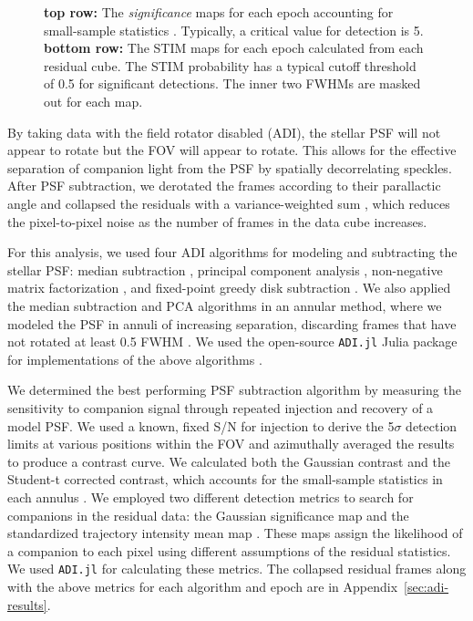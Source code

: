 \documentclass[twocolumn,linenumbers]{aastex631}
\begin{document}
\begin{figure*}
    \centering
    \caption{\textbf{top row:} The \textit{significance} maps for each epoch accounting for small-sample statistics \citep{mawetFundamentalLimitationsHigh2014}. Typically, a critical value for detection is 5. \textbf{bottom row:} The STIM maps for each epoch calculated from each residual cube. The STIM probability has a typical cutoff threshold of 0.5 for significant detections. The inner two FWHMs are masked out for each map.}
    \label{fig:detection}
\end{figure*}

By taking data with the field rotator disabled (ADI), the stellar PSF will not appear to rotate but the FOV will appear to rotate. This allows for the effective separation of companion light from the PSF by spatially decorrelating speckles.  After PSF subtraction, we derotated the frames according to their parallactic angle and collapsed the residuals with a variance-weighted sum \citep{bottomNoiseweightedAngularDifferential2017a}, which reduces the pixel-to-pixel noise as the number of frames in the data cube increases.

For this analysis, we used four ADI algorithms for modeling and subtracting the stellar PSF: median subtraction \citep{maroisAngularDifferentialImaging2006}, principal component analysis \citep[PCA, also referred to as KLIP;][]{soummerDetectionCharacterizationExoplanets2012a}, non-negative matrix factorization \citep[NMF;][]{renNonnegativeMatrixFactorization2018a}, and fixed-point greedy disk subtraction \citep[GreeDS;][]{pairetReferencelessAlgorithmCircumstellar2019a,pairetMAYONNAISEMorphologicalComponents2020}. We also applied the median subtraction and PCA algorithms in an annular method, where we modeled the PSF in annuli of increasing separation, discarding frames that have not rotated at least 0.5 FWHM \citep{maroisAngularDifferentialImaging2006}. We used the open-source \texttt{ADI.jl} Julia package for implementations of the above algorithms \citep{lucasADIJlJulia2020}.

We determined the best performing PSF subtraction algorithm by measuring the sensitivity to companion signal through repeated injection and recovery of a model PSF. We used a known, fixed S/N for injection to derive the 5$\sigma$ detection limits at various positions within the FOV and azimuthally averaged the results to produce a contrast curve. We calculated both the Gaussian contrast and the Student-t corrected contrast, which accounts for the small-sample statistics in each annulus \citep{mawetFundamentalLimitationsHigh2014}. We employed two different detection metrics to search for companions in the residual data: the Gaussian significance map \citep{mawetFundamentalLimitationsHigh2014} and the standardized trajectory intensity mean map \citep[STIM map;][]{pairetSTIMMapDetection2019}. These maps assign the likelihood of a companion to each pixel using different assumptions of the residual statistics. We used \texttt{ADI.jl} for calculating these metrics. The collapsed residual frames along with the above metrics for each algorithm and epoch are in Appendix~\ref{sec:adi-results}.
\end{document}
